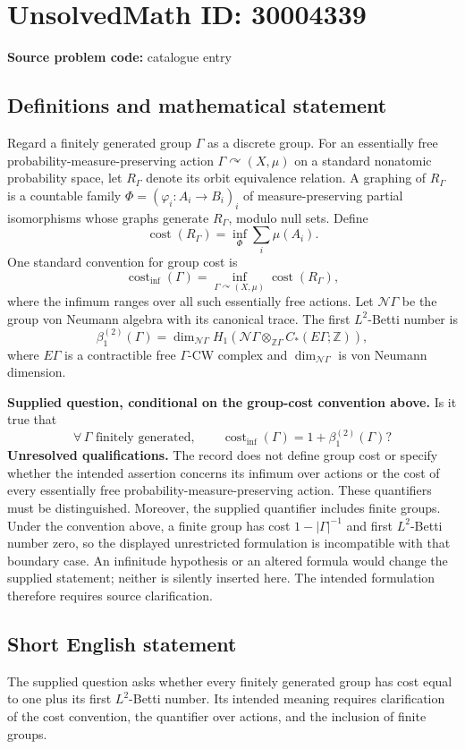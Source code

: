 \documentclass[11pt]{article}
\newcommand{\Z}{\mathbb{Z}}
\begin{document}
\section*{UnsolvedMath ID: 30004339}
\textbf{Source problem code:} catalogue entry
\subsection{Definitions and mathematical statement}
Regard a finitely generated group \(\Gamma\) as a discrete group. For an essentially free probability-measure-preserving action \(\Gamma\curvearrowright(X,\mu)\) on a standard nonatomic probability space, let \(R_\Gamma\) denote its orbit equivalence relation. A graphing of \(R_\Gamma\) is a countable family \(\Phi=(\varphi_i:A_i\to B_i)_i\) of measure-preserving partial isomorphisms whose graphs generate \(R_\Gamma\), modulo null sets. Define
\[
\operatorname{cost}(R_\Gamma)=\inf_{\Phi}\sum_i\mu(A_i).
\]
One standard convention for group cost is
\[
\operatorname{cost}_{\inf}(\Gamma)=\inf_{\Gamma\curvearrowright(X,\mu)}\operatorname{cost}(R_\Gamma),
\]
where the infimum ranges over all such essentially free actions. Let \(\mathcal N\Gamma\) be the group von Neumann algebra with its canonical trace. The first \(L^2\)-Betti number is
\[
\beta_1^{(2)}(\Gamma)=\dim_{\mathcal N\Gamma}H_1\!\left(\mathcal N\Gamma\otimes_{\Z\Gamma}C_*(E\Gamma;\Z)\right),
\]
where \(E\Gamma\) is a contractible free \(\Gamma\)-CW complex and \(\dim_{\mathcal N\Gamma}\) is von Neumann dimension.

\textbf{Supplied question, conditional on the group-cost convention above.} Is it true that
\[
\forall\,\Gamma\text{ finitely generated},\qquad
\operatorname{cost}_{\inf}(\Gamma)=1+\beta_1^{(2)}(\Gamma)?
\]
\textbf{Unresolved qualifications.} The record does not define group cost or specify whether the intended assertion concerns its infimum over actions or the cost of every essentially free probability-measure-preserving action. These quantifiers must be distinguished. Moreover, the supplied quantifier includes finite groups. Under the convention above, a finite group has cost \(1-|\Gamma|^{-1}\) and first \(L^2\)-Betti number zero, so the displayed unrestricted formulation is incompatible with that boundary case. An infinitude hypothesis or an altered formula would change the supplied statement; neither is silently inserted here. The intended formulation therefore requires source clarification.
\subsection{Short English statement}
The supplied question asks whether every finitely generated group has cost equal to one plus its first \(L^2\)-Betti number. Its intended meaning requires clarification of the cost convention, the quantifier over actions, and the inclusion of finite groups.
\end{document}
